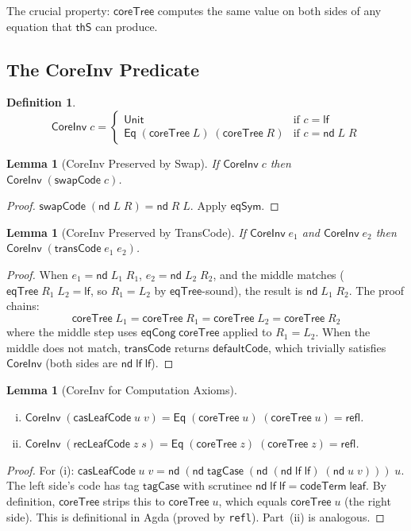 \documentclass[11pt]{article}
\newtheorem{lemma}[theorem]{Lemma}
\newtheorem{definition}[theorem]{Definition}
\newcommand{\lf}{\mathsf{lf}}
\newcommand{\nd}{\mathsf{nd}}
\newcommand{\codeTerm}{\mathsf{codeTerm}}
\newcommand{\thS}{\mathsf{thS}}
\newcommand{\eqTree}{\mathsf{eqTree}}
\newcommand{\transCode}{\mathsf{transCode}}
\newcommand{\swapCode}{\mathsf{swapCode}}
\newcommand{\Eq}{\mathsf{Eq}}
\newcommand{\coreTree}{\mathsf{coreTree}}
\newcommand{\CoreInv}{\mathsf{CoreInv}}
\begin{document}
\noindent The crucial property: $\coreTree$ computes the same value on both
sides of any equation that $\thS$ can produce.

\subsection{The CoreInv Predicate}

\begin{definition}
\[
  \CoreInv\;c =
  \begin{cases}
    \mathsf{Unit} & \text{if } c = \lf \\
    \Eq\;(\coreTree\;L)\;(\coreTree\;R) & \text{if } c = \nd\;L\;R
  \end{cases}
\]
\end{definition}

\begin{lemma}[CoreInv Preserved by Swap]
If $\CoreInv\;c$ then $\CoreInv\;(\swapCode\;c)$.
\end{lemma}
\begin{proof}
$\swapCode\;(\nd\;L\;R) = \nd\;R\;L$. Apply $\mathsf{eqSym}$.
\end{proof}

\begin{lemma}[CoreInv Preserved by TransCode]\label{lem:coreinv-trans}
If $\CoreInv\;e_1$ and $\CoreInv\;e_2$ then $\CoreInv\;(\transCode\;e_1\;e_2)$.
\end{lemma}
\begin{proof}
When $e_1 = \nd\;L_1\;R_1$, $e_2 = \nd\;L_2\;R_2$, and the middle matches
($\eqTree\;R_1\;L_2 = \lf$, so $R_1 = L_2$ by $\eqTree$-sound), the result
is $\nd\;L_1\;R_2$. The proof chains:
\[
  \coreTree\;L_1 = \coreTree\;R_1 = \coreTree\;L_2 = \coreTree\;R_2
\]
where the middle step uses $\mathsf{eqCong}\;\coreTree$ applied to $R_1 = L_2$.
When the middle does not match, $\transCode$ returns $\mathsf{defaultCode}$,
which trivially satisfies $\CoreInv$ (both sides are $\nd\;\lf\;\lf$).
\end{proof}

\begin{lemma}[CoreInv for Computation Axioms]\mbox{}
\begin{enumerate}[(i)]
  \item $\CoreInv\;(\mathsf{casLeafCode}\;u\;v) = \Eq\;(\coreTree\;u)\;(\coreTree\;u) = \mathsf{refl}$.
  \item $\CoreInv\;(\mathsf{recLeafCode}\;z\;s) = \Eq\;(\coreTree\;z)\;(\coreTree\;z) = \mathsf{refl}$.
\end{enumerate}
\end{lemma}
\begin{proof}
For (i): $\mathsf{casLeafCode}\;u\;v = \nd\;(\nd\;\mathsf{tagCase}\;(\nd\;(\nd\;\lf\;\lf)\;(\nd\;u\;v)))\;u$.
The left side's code has tag $\mathsf{tagCase}$ with scrutinee $\nd\;\lf\;\lf = \codeTerm\;\mathsf{leaf}$.
By definition, $\coreTree$ strips this to $\coreTree\;u$, which equals $\coreTree\;u$ (the right side).
This is definitional in Agda (proved by \texttt{refl}). Part~(ii) is analogous.
\end{proof}
\end{document}
